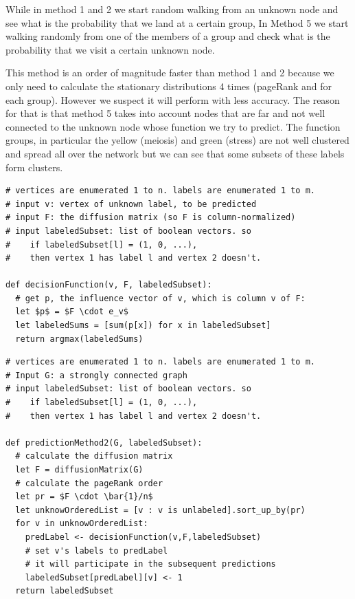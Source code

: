 \begin{itemize}
While in method 1 and 2 we start random walking from an unknown node and see
what is the probability that we land at a certain group, In Method 5 we start
walking randomly from one of the members of a group and check what is the
probability that we visit a certain unknown node.

This method is an order of magnitude faster than method 1 and 2 because we only
need to calculate the stationary distributions 4 times (pageRank and for each
group). However we suspect it will perform with less accuracy.
The reason for that is that method 5 takes into account nodes that are far and not well connected to the
unknown node whose function we try to predict.
The function groups, in particular the yellow (meiosis) and green (stress) are not
well clustered and spread all over the network but we can see that
some subsets of these labels form clusters.

\end{itemize}

\begin{minipage}{\linewidth}
\begin{lstlisting}[mathescape=true, 
    caption = {method 2, decision funciton}, label={code:decision_function}]
# vertices are enumerated 1 to n. labels are enumerated 1 to m.
# input v: vertex of unknown label, to be predicted
# input F: the diffusion matrix (so F is column-normalized)
# input labeledSubset: list of boolean vectors. so
#    if labeledSubset[l] = (1, 0, ...),
#    then vertex 1 has label l and vertex 2 doesn't.

def decisionFunction(v, F, labeledSubset):
  # get p, the influence vector of v, which is column v of F:
  let $p$ = $F \cdot e_v$
  let labeledSums = [sum(p[x]) for x in labeledSubset]
  return argmax(labeledSums)
\end{lstlisting}
\end{minipage}

\begin{minipage}{\linewidth}
\begin{lstlisting}[mathescape=true, 
    caption = {method 2, main funciton}, label={code:method2}]
# vertices are enumerated 1 to n. labels are enumerated 1 to m.
# Input G: a strongly connected graph
# input labeledSubset: list of boolean vectors. so 
#    if labeledSubset[l] = (1, 0, ...),
#    then vertex 1 has label l and vertex 2 doesn't.

def predictionMethod2(G, labeledSubset):
  # calculate the diffusion matrix
  let F = diffusionMatrix(G)
  # calculate the pageRank order
  let pr = $F \cdot \bar{1}/n$
  let unknowOrderedList = [v : v is unlabeled].sort_up_by(pr)
  for v in unknowOrderedList:
    predLabel <- decisionFunction(v,F,labeledSubset)
    # set v's labels to predLabel
    # it will participate in the subsequent predictions
    labeledSubset[predLabel][v] <- 1
  return labeledSubset
\end{lstlisting}
\end{minipage}

